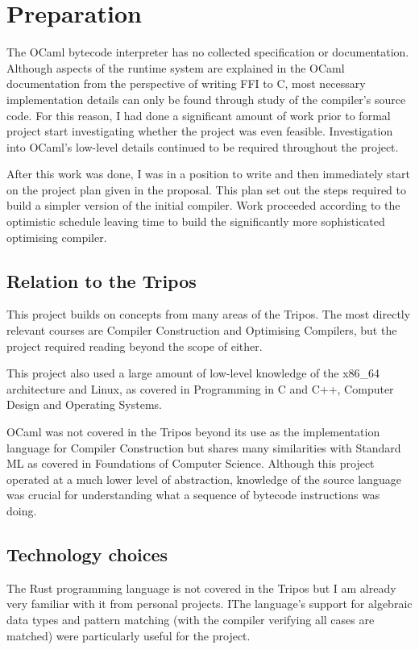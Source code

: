 \chapter{Preparation}

The OCaml bytecode interpreter has no collected specification or documentation. Although aspects of
the runtime system are explained in the OCaml documentation from the perspective of writing FFI to
C, most necessary implementation details can only be found through study of the compiler's source
code. For this reason, I had done a significant amount of work prior to formal project start
investigating whether the project was even feasible. Investigation into OCaml's low-level details
continued to be required throughout the project.

After this work was done, I was in a position to write and then immediately start on the project
plan given in the proposal. This plan set out the steps required to build a simpler version of the
initial compiler. Work proceeded according to the optimistic schedule leaving time to build the
significantly more sophisticated optimising compiler.

\section{Relation to the Tripos}

This project builds on concepts from many areas of the Tripos. The most directly
relevant courses are Compiler Construction and Optimising Compilers, but the project required
reading beyond the scope of either.

This project also used a large amount of low-level knowledge of the x86\_64 architecture and Linux,
as covered in Programming in C and C++, Computer Design and Operating Systems.

OCaml was not covered in the Tripos beyond its use as the implementation language for Compiler
Construction but shares many similarities with Standard ML as covered in Foundations of Computer
Science. Although this project operated at a much lower level of abstraction, knowledge of the
source language was crucial for understanding what a sequence of bytecode instructions was doing.

\section{Technology choices}

The Rust programming language is not covered in the Tripos but I am already very familiar with
it from personal projects. IThe language's support for algebraic data types and pattern matching
(with the compiler verifying all cases are matched) were particularly useful for the project.

